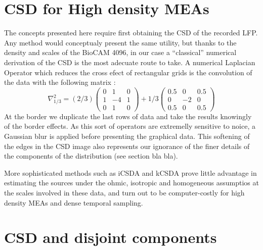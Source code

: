 \documentclass{article}
\begin{document}
\section{CSD for High density MEAs}

The concepts presented here require first obtaining the CSD of the recorded LFP. Any method would conceptualy present the same utility, but thanks to the density and scales of the BioCAM 4096, in our case a ``classical'' numerical derivation of the CSD is the most adecuate route to take. A numerical Laplacian Operator which reduces the cross efect of rectangular grids is the convolution of the data with the following matrix \cite{Lindberg90}:
\begin{equation}
\nabla^2_{1/3}=(2/3)
\begin{pmatrix}
  0 & 1 & 0 \\
  1 & -4 & 1 \\
  0 & 1 & 0
\end{pmatrix}
+1/3
\begin{pmatrix}
  0.5 & 0 & 0.5 \\
  0 & -2 & 0 \\
  0.5 & 0 & 0.5
\end{pmatrix}  
\end{equation}
At the border we duplicate the last rows of data and take the results knowingly of the border effects. As this sort of operators are extremelly sensitive to noice, a Gaussian blur is applied before presenting the graphical data. This softening of the edges in the CSD image also represents our ignorance of the finer details of the components of the distribution (see section bla bla).


More sophisticated methods such as iCSDA \cite{Leski2011} and kCSDA \cite{Potworowski2011} prove little advantage in estimating the sources under the ohmic, isotropic and homogeneous assumptios at the scales involved in these data, and turn out to be computer-costly for high density MEAs and dense temporal sampling. 



\section{CSD and disjoint components}
\end{document}

